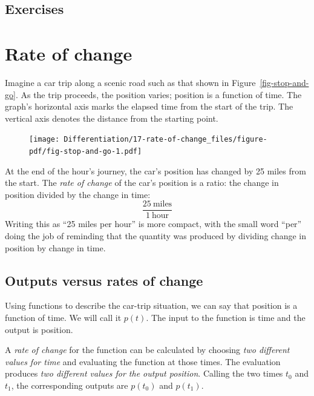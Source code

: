 \documentclass[
  letterpaper,
  DIV=11,
  numbers=noendperiod,
  oneside]{scrreprt}
\begin{document}
\hypertarget{exercises}{%
\section{Exercises}\label{exercises}}

\hypertarget{sec-rate-of-change}{%
\chapter{Rate of change}\label{sec-rate-of-change}}

Imagine a car trip along a scenic road such as that shown in
Figure~\ref{fig-stop-and-go}. As the trip proceeds, the position varies;
position is a function of time. The graph's horizontal axis marks the
elapsed time from the start of the trip. The vertical axis denotes the
distance from the starting point.

\begin{figure}


{\centering \texttt{[image: Differentiation/17-rate-of-change\_files/figure-pdf/fig-stop-and-go-1.pdf]}

}

\end{figure}

At the end of the hour's journey, the car's position has changed by 25
miles from the start. The \emph{rate of change} of the car's position is
a ratio: the change in position divided by the change in time:
\[\frac{25\ \text{miles}}{1\ \text{hour}}\] Writing this as ``25 miles
per hour'' is more compact, with the small word ``per'' doing the job of
reminding that the quantity was produced by dividing change in position
by change in time.

\hypertarget{outputs-versus-rates-of-change}{%
\section{Outputs versus rates of
change}\label{outputs-versus-rates-of-change}}

Using functions to describe the car-trip situation, we can say that
position is a function of time. We will call it \(p(t)\). The input to
the function is time and the output is position.

A \emph{rate of change} for the function can be calculated by choosing
\emph{two different values for time} and evaluating the function at
those times. The evaluation produces \emph{two different values for the
output position}. Calling the two times \(t_0\) and \(t_1\), the
corresponding outputs are \(p(t_0)\) and \(p(t_1)\).
\end{document}
